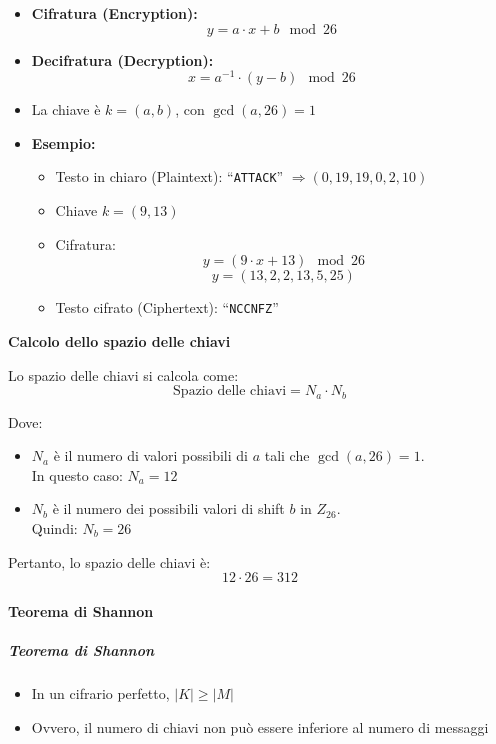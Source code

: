 \documentclass{article}
\begin{document}
\begin{itemize}
    \item \textbf{Cifratura (Encryption):}
    \[
    y = a \cdot x + b \mod 26
    \]
    
    \item \textbf{Decifratura (Decryption):}
    \[
    x = a^{-1} \cdot (y - b) \mod 26
    \]
    
    \item La chiave è $k = (a, b)$, con $\gcd(a, 26) = 1$
    
    \item \textbf{Esempio:}
    \begin{itemize}
        \item Testo in chiaro (Plaintext): ``\texttt{ATTACK}'' $\Rightarrow (0, 19, 19, 0, 2, 10)$
        \item Chiave $k = (9, 13)$
        \item Cifratura:
        \[
        y = (9 \cdot x + 13) \mod 26
        \]
        \[
        y = (13, 2, 2, 13, 5, 25)
        \]
        \item Testo cifrato (Ciphertext): ``\texttt{NCCNFZ}''
    \end{itemize}
\end{itemize}

\textbf{Calcolo dello spazio delle chiavi}

Lo spazio delle chiavi si calcola come:
\[
\text{Spazio delle chiavi} = N_a \cdot N_b
\]

Dove:
\begin{itemize}
    \item $N_a$ è il numero di valori possibili di $a$ tali che $\gcd(a, 26) = 1$. \\
    In questo caso: $N_a = 12$
    \item $N_b$ è il numero dei possibili valori di shift $b$ in $Z_{26}$. \\
    Quindi: $N_b = 26$
\end{itemize}

Pertanto, lo spazio delle chiavi è:
\[
12 \cdot 26 = 312
\]

\paragraph{Teorema di Shannon}

\subparagraph{Teorema di Shannon}
\begin{itemize}
    \item In un cifrario perfetto, $|K| \geq |M|$
    \item Ovvero, il numero di chiavi non può essere inferiore al numero di messaggi
\end{itemize}
\end{document}

